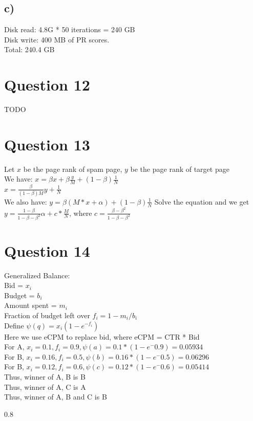 \documentclass{article}
\newenvironment{myenv}[1]
  {\begin{spacing}{#1}}
  {\end{spacing}}
\begin{document}
\subsection{c)}
Disk read: 4.8G * 50 iterations = 240 GB  \\
Disk write: 400 MB of PR scores. \\
Total: 240.4 GB

\section{Question 12}
TODO

\section{Question 13}
Let $x$ be the page rank of spam page, $y$ be the page rank of target page\\
We have: $x = \beta x + \beta\frac{y}{M} + (1-\beta)\frac{1}{N}$ \\
$x = \frac{\beta}{(1-\beta)M}y + \frac{1}{N}$ \\
We also have: $y = \beta (M*x + \alpha) + (1-\beta)\frac{1}{N}$
Solve the equation and we get $y = \frac{1-\beta}{1-\beta-\beta^2}\alpha + c*\frac{M}{N}$, where $c =  \frac{\beta - \beta^2}{1 - \beta - \beta^2}$

\section{Question 14}
Generalized Balance: \\
Bid = $x_i$\\
Budget = $b_i$ \\
Amount spent = $m_i$ \\
Fraction of budget left over $f_i = 1-m_i/b_i$ \\
Define $\psi(q) = x_i(1-e^{-f_i})$ \\

Here we use eCPM to replace bid, where eCPM = CTR * Bid \\
For A, $x_i = 0.1,  f_i = 0.9, \psi(a) = 0.1*(1-e^-0.9) = 0.05934$ \\
For B, $x_i = 0.16,  f_i = 0.5, \psi(b) = 0.16*(1-e^-0.5) = 0.06296$ \\
For B, $x_i = 0.12,  f_i = 0.6, \psi(c) = 0.12*(1-e^-0.6) = 0.05414$ \\
Thus, winner of A, B is B \\
Thus, winner of A, C is A \\
Thus, winner of A, B and C is B \\

\begin{myenv}{0.8}
\begin{verbatim}
\end{verbatim}
\end{myenv}
\end{document}
